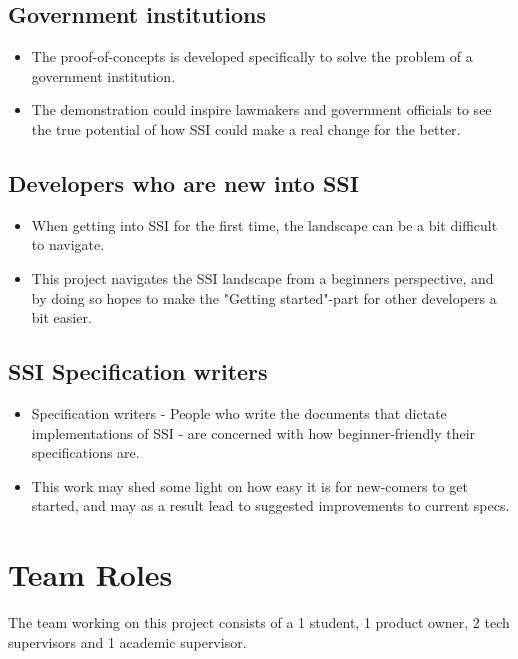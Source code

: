 \subsection{Government institutions}

\begin{itemize}
\item The proof-of-concepts is developed specifically to solve the problem of a government institution.
\item The demonstration could inspire lawmakers and government officials to see the true potential of how SSI could make a real change for the better.
\end{itemize}

\subsection{Developers who are new into SSI}
\begin{itemize}
\item When getting into SSI for the first time, the landscape can be a bit difficult to navigate.
\item This project navigates the SSI landscape from a beginners perspective, and by doing so hopes to make the "Getting started"-part for other developers a bit easier.
\end{itemize}

\subsection{SSI Specification writers}
\begin{itemize}
\item Specification writers - People who write the documents that dictate implementations of SSI - are concerned with how beginner-friendly their specifications are.
\item This work may shed some light on how easy it is for new-comers to get started, and may as a result lead to suggested improvements to current specs.
\end{itemize}





\section{Team Roles}

The team working on this project consists of a 1 student, 1 product owner, 2 tech supervisors and 1 academic supervisor.

